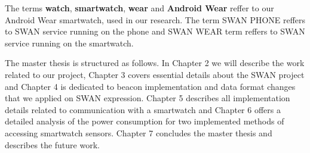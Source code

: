 The terms \textbf{watch}, \textbf{smartwatch}, \textbf{wear} and \textbf{Android Wear} reffer to our Android Wear smartwatch, used in our research.
The term SWAN PHONE reffers to SWAN service running on the phone and SWAN WEAR term reffers to SWAN service running on the smartwatch.

The master thesis is structured as follows. In Chapter 2 we will describe the work related to our project, Chapter 3 covers  essential details about the SWAN project and Chapter 4 is dedicated to 
beacon implementation and data format changes that we applied on SWAN  expression. Chapter 5 describes all implementation details related to  communication
with a smartwatch and Chapter 6 offers a detailed analysis of the power consumption for two implemented methods of accessing smartwatch sensors. Chapter 7 concludes the master thesis and describes 
the future work.
